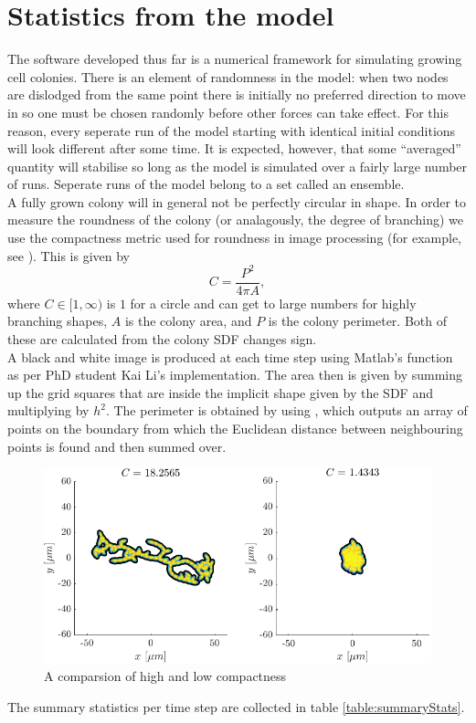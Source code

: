 \section{Statistics from the model}
The software developed thus far is a numerical framework for simulating growing cell colonies.
There is an element of randomness in the model: when two nodes are dislodged from the 
same point there is initially no preferred direction to move in so one must be chosen randomly
before other forces can take effect. For this reason, every seperate run of the model 
starting with identical initial conditions will look different after some time. 
It is expected, however, that some ``averaged''
quantity will stabilise so long as the model is simulated over a fairly large number of runs.
Seperate runs of the model belong to a set called an ensemble.
\\

A fully grown colony will in general not be perfectly circular in shape.
In order to measure the roundness of the colony (or analagously, the degree of branching) 
we use the compactness metric used for 
 roundness in image processing (for example, see \cite{li2024off}). This is given by
\begin{equation}
  C = \frac{P^2}{4 \pi A},
\end{equation}
where $C \in [1, \infty)$ is $1$ for a circle and can get to large numbers for 
highly branching shapes, $A$ is the colony area, and $P$ is the colony perimeter. 
Both of these are calculated from the colony SDF changes sign. 
\\

A black and white image 
is produced at each time step using Matlab's function  as per
PhD student Kai Li's implementation. The area then is given by summing up the grid squares that are
inside the implicit shape given by the SDF and multiplying by $h^2$. The perimeter
is obtained by using , which outputs an array of points on the boundary
from which the Euclidean distance between neighbouring points is found and then summed over.
\begin{figure}[!htb]
    \centering
    \includegraphics[width=\textwidth]{chapter1/figures/compareCompactness.pdf}
    \caption{A comparsion of high and low compactness}
    \label{fig:compatness_comparison}
\end{figure}
The summary statistics per time step are collected in table \ref{table:summaryStats}.

